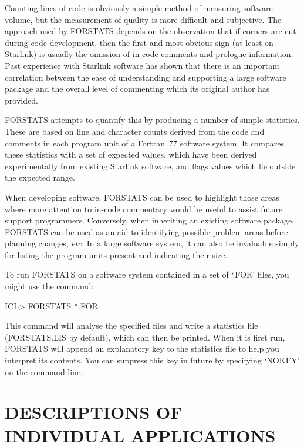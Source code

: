 \documentclass[twoside,11pt,nolof]{starlink}
\begin{document}
Counting lines of code is obviously a simple method of measuring software
volume, but the measurement of quality is more difficult and subjective.
The approach used by FORSTATS depends on the observation that if corners are
cut during code development, then the first and most obvious sign (at least
on Starlink) is usually the omission of in-code comments and prologue
information.
Past experience with Starlink software has shown that there is an important
correlation between the ease of understanding and supporting a large
software package and the overall level of commenting which its original
author has provided.

FORSTATS attempts to quantify this by producing a number of simple
statistics.
These are based on line and character counts derived from the code and
comments in each program unit of a Fortran~77 software system.
It compares these statistics with a set of expected values, which have been
derived experimentally from existing Starlink software, and flags values
which lie outside the expected range.

When developing software, FORSTATS can be used to highlight those areas
where more attention to in-code commentary would be useful to assist future
support programmers.
Conversely, when inheriting an existing software package, FORSTATS can be
used as an aid to identifying possible problem areas before planning
changes, \emph{etc.}
In a large software system, it can also be invaluable simply for listing the
program units present and indicating their size.

To run FORSTATS on a software system contained in a set of `.FOR' files, you
might use the command:

\begin{terminalv}
ICL> FORSTATS *.FOR
\end{terminalv}

This command will analyse the specified files and write a statistics file
(FORSTATS.LIS by default), which can then be printed.
When it is first run, FORSTATS will append an explanatory key to the
statistics file to help you interpret its contents.
You can suppress this key in future by specifying `NOKEY' on the command
line.

\newpage
\appendix
\section{DESCRIPTIONS OF INDIVIDUAL APPLICATIONS}
\label{appendix:descriptions}
\end{document}

